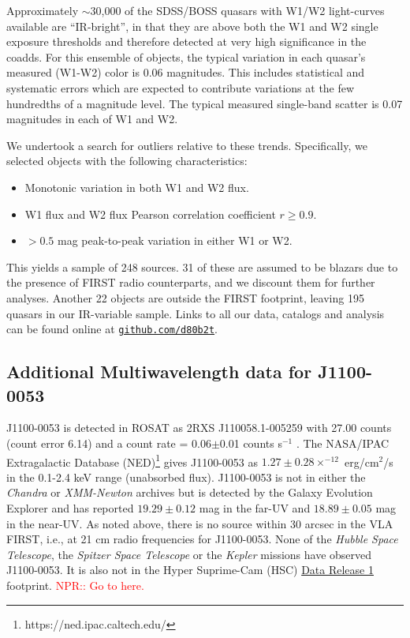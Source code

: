 \documentclass[11pt,a4paper]{article}
\begin{document}
Approximately $\sim$30,000 of the SDSS/BOSS quasars with W1/W2
light-curves available are ``IR-bright'', in that they are above both
the W1 and W2 single exposure thresholds and therefore detected at
very high significance in the coadds. For this ensemble of objects,
the typical variation in each quasar's measured (W1-W2) color is 0.06
magnitudes.  This includes statistical and systematic errors which are
expected to contribute variations at the few hundredths of a magnitude
level. The typical measured single-band scatter is 0.07 magnitudes in
each of W1 and W2.

We undertook a search for outliers relative to these
trends. Specifically, we selected objects with the following
characteristics:
\begin{itemize}
    \item Monotonic variation in both W1 and W2 flux.
    \item W1 flux and W2 flux Pearson correlation coefficient $r \geq0.9$.
    \item $>0.5$ mag peak-to-peak variation in either W1 or W2.
\end{itemize}
This yields a sample of 248 sources. 31 of these are assumed to be
blazars due to the presence of FIRST \citep[Faint Images of the Radio
Sky at Twenty-Centimeters; ][]{Becker1995} radio counterparts, and we
discount them for further analyses. Another 22 objects are outside the
FIRST footprint, leaving 195 quasars in our IR-variable sample. Links
to all our data, catalogs and analysis can be found online at
\href{https://github.com/d80b2t}{{\tt github.com/d80b2t}}.


\subsection{Additional Multiwavelength data for J1100-0053}
J1100-0053 is detected in ROSAT as 2RXS J110058.1-005259 with 27.00
counts (count error 6.14) and a count rate = 0.06$\pm$0.01 counts
s$^{-1}$ \cite{Boller2016}. The NASA/IPAC Extragalactic Database
(NED)\footnote{https://ned.ipac.caltech.edu/} gives J1100-0053 as
$1.27\pm0.28 \times^{-12}$ erg/cm$^{2}$/s in the 0.1-2.4 keV range
(unabsorbed flux). J1100-0053 is not in either the {\it Chandra} or
{\it XMM-Newton} archives but is detected by the Galaxy Evolution
Explorer \citep[GALEX; ][]{Martin2005, Morrissey2007} and has reported
$19.29\pm0.12$ mag in the far-UV and $18.89\pm0.05$ mag in the
near-UV.
As noted above, there is no source within 30 arcsec in the VLA FIRST,
i.e., at 21 cm radio frequencies for J1100-0053. None of the {\it
Hubble Space Telescope}, the {\it Spitzer Space Telescope} or the {\it
Kepler} missions have observed J1100-0053.  It is also not in the
Hyper Suprime-Cam (HSC)
\href{https://hsc-release.mtk.nao.ac.jp/doc/}{Data Release 1}
\citep{Aihara2017} footprint.
\textcolor{red}{NPR:: Go to here.}
\end{document}
